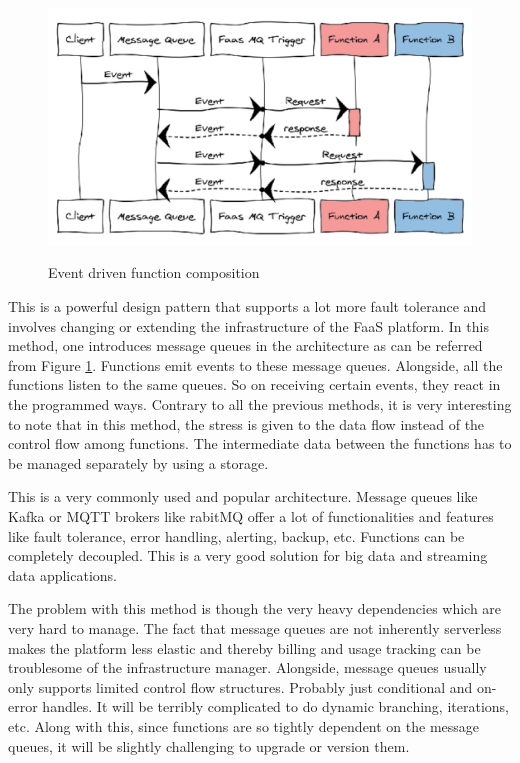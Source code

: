 \documentclass[12pt,titlepage]{article}
\begin{document}
\begin{figure}
\caption{Event driven function composition}
\centering
\includegraphics[width=150mm]{./thesis_images/event.png}
\label{fig:Event}
\end{figure}

This is a powerful design pattern that supports a lot more fault tolerance and
involves changing or extending the infrastructure of the FaaS platform. In this
method, one introduces message queues in the architecture as can be referred
from Figure \ref{fig:Event}. Functions emit events to these message queues. Alongside, all the
functions listen to the same queues. So on receiving certain events, they react
in the programmed ways. Contrary to all the previous methods, it is very
interesting to note that in this method, the stress is given to the data flow
instead of the control flow among functions. The intermediate data between the
functions has to be managed separately by using a storage.

This is a very commonly used and popular architecture. Message queues like Kafka
or MQTT brokers like rabitMQ offer a lot of functionalities and features like
fault tolerance, error handling, alerting, backup, etc. Functions can be
completely decoupled. This is a very good solution for big data and streaming
data applications.

The problem with this method is though the very heavy dependencies which are
very hard to manage. The fact that message queues are not inherently serverless
makes the platform less elastic and thereby billing and usage tracking can be
troublesome of the infrastructure manager. Alongside, message queues usually
only supports limited control flow structures. Probably just conditional and
on-error handles. It will be terribly complicated to do dynamic branching,
iterations, etc. Along with this, since functions are so tightly dependent on
the message queues, it will be slightly challenging to upgrade or version them. 
\end{document}
